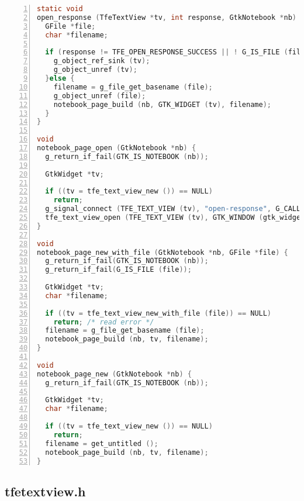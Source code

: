 \begin{lstlisting}[language=C, numbers=left]
static void
open_response (TfeTextView *tv, int response, GtkNotebook *nb) {
  GFile *file;
  char *filename;

  if (response != TFE_OPEN_RESPONSE_SUCCESS || ! G_IS_FILE (file = tfe_text_view_get_file (tv))) {
    g_object_ref_sink (tv);
    g_object_unref (tv);
  }else {
    filename = g_file_get_basename (file);
    g_object_unref (file);
    notebook_page_build (nb, GTK_WIDGET (tv), filename);
  }
}

void
notebook_page_open (GtkNotebook *nb) {
  g_return_if_fail(GTK_IS_NOTEBOOK (nb));

  GtkWidget *tv;

  if ((tv = tfe_text_view_new ()) == NULL)
    return;
  g_signal_connect (TFE_TEXT_VIEW (tv), "open-response", G_CALLBACK (open_response), nb);
  tfe_text_view_open (TFE_TEXT_VIEW (tv), GTK_WINDOW (gtk_widget_get_ancestor (GTK_WIDGET (nb), GTK_TYPE_WINDOW)));
}

void
notebook_page_new_with_file (GtkNotebook *nb, GFile *file) {
  g_return_if_fail(GTK_IS_NOTEBOOK (nb));
  g_return_if_fail(G_IS_FILE (file));

  GtkWidget *tv;
  char *filename;

  if ((tv = tfe_text_view_new_with_file (file)) == NULL)
    return; /* read error */
  filename = g_file_get_basename (file);
  notebook_page_build (nb, tv, filename);
}

void
notebook_page_new (GtkNotebook *nb) {
  g_return_if_fail(GTK_IS_NOTEBOOK (nb));

  GtkWidget *tv;
  char *filename;

  if ((tv = tfe_text_view_new ()) == NULL)
    return;
  filename = get_untitled ();
  notebook_page_build (nb, tv, filename);
}
\end{lstlisting}

\hypertarget{tfetextview.h}{%
\subsection{tfetextview.h}\label{tfetextview.h}}


